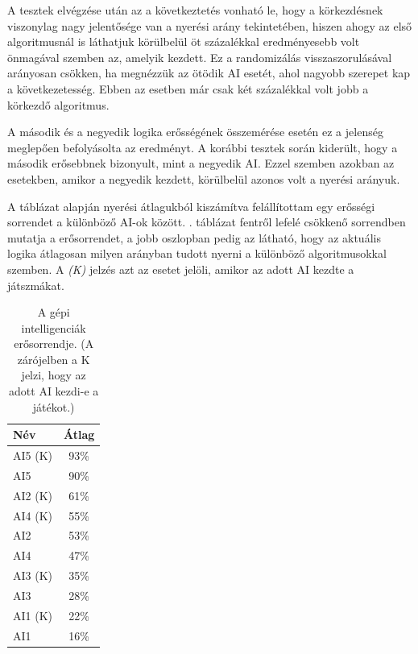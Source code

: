 A tesztek elvégzése után az a következtetés vonható le, hogy a körkezdésnek viszonylag nagy jelentősége van a nyerési arány tekintetében, hiszen ahogy az első algoritmusnál is láthatjuk körülbelül öt százalékkal eredményesebb volt önmagával szemben az, amelyik kezdett. Ez a randomizálás visszaszorulásával arányosan csökken, ha megnézzük az ötödik AI esetét, ahol nagyobb szerepet kap a következetesség. Ebben az esetben már csak két százalékkal volt jobb a körkezdő algoritmus.

A második és a negyedik logika erősségének összemérése esetén ez a jelenség meglepően befolyásolta az eredményt. A korábbi tesztek során kiderült, hogy a második erősebbnek bizonyult, mint a negyedik AI. Ezzel szemben azokban az esetekben, amikor a negyedik kezdett, körülbelül azonos volt a nyerési arányuk.

A táblázat alapján nyerési átlagukból kiszámítva felállítottam egy erősségi sorrendet a különböző AI-ok között. . táblázat fentről lefelé csökkenő sorrendben mutatja a erősorrendet, a jobb oszlopban pedig az látható, hogy az aktuális logika átlagosan milyen arányban tudott nyerni a különböző algoritmusokkal szemben. A \textit{(K)} jelzés azt az esetet jelöli, amikor az adott AI kezdte a játszmákat.

\begin{table}[H]
\caption{A gépi intelligenciák erősorrendje. (A zárójelben a K jelzi, hogy az adott AI kezdi-e a játékot.)}
\label{tab:ai_ranking}
\medskip
\centering
\begin{tabular}{|l|c|} 
\hline
Név & Átlag \\
 \hline
 AI5 (K) & 93\%\\ 
 \hline
 AI5 & 90\%\\ 
 \hline
 AI2 (K) & 61\%\\ 
 \hline
 AI4 (K) & 55\%\\ 
 \hline
 AI2 & 53\%\\
 \hline
  AI4 & 47\%\\ 
 \hline
 AI3 (K) & 35\%\\ 
 \hline
 AI3 & 28\%\\ 
 \hline
 AI1 (K) & 22\%\\ 
 \hline
 AI1 & 16\%\\
 \hline
\end{tabular}
\end{table}